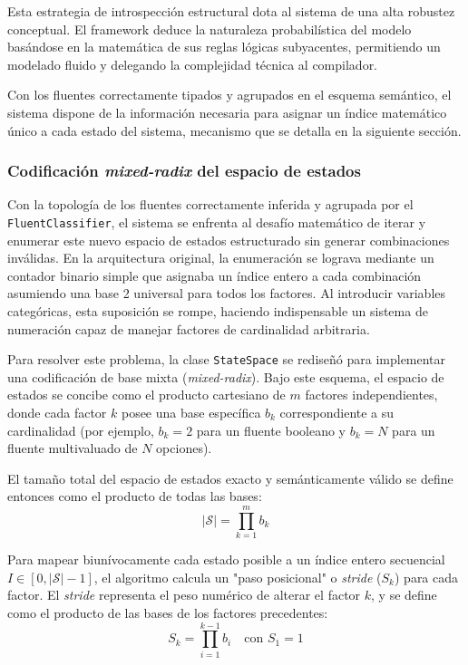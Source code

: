 Esta estrategia de introspección estructural dota al sistema de una alta robustez conceptual. El framework deduce la naturaleza probabilística del modelo basándose en la matemática de sus reglas lógicas subyacentes, permitiendo un modelado fluido y delegando la complejidad técnica al compilador. 

Con los fluentes correctamente tipados y agrupados en el esquema semántico, el sistema dispone de la información necesaria para asignar un índice matemático único a cada estado del sistema, mecanismo que se detalla en la siguiente sección.

\subsubsection{Codificación \textit{mixed-radix} del espacio de estados}
\label{sec:di-mixed-radix}

Con la topología de los fluentes correctamente inferida y agrupada por el \texttt{FluentClassifier}, el sistema se enfrenta al desafío matemático de iterar y enumerar este nuevo espacio de estados estructurado sin generar combinaciones inválidas. En la arquitectura original, la enumeración se lograva mediante un contador binario simple que asignaba un índice entero a cada combinación asumiendo una base 2 universal para todos los factores. Al introducir variables categóricas, esta suposición se rompe, haciendo indispensable un sistema de numeración capaz de manejar factores de cardinalidad arbitraria.

Para resolver este problema, la clase \texttt{StateSpace} se rediseñó para implementar una codificación de base mixta (\textit{mixed-radix}). Bajo este esquema, el espacio de estados se concibe como el producto cartesiano de $m$ factores independientes, donde cada factor $k$ posee una base específica $b_k$ correspondiente a su cardinalidad (por ejemplo, $b_k = 2$ para un fluente booleano y $b_k = N$ para un fluente multivaluado de $N$ opciones).

El tamaño total del espacio de estados exacto y semánticamente válido se define entonces como el producto de todas las bases:
\begin{equation}
    |\mathcal{S}| = \prod_{k=1}^{m} b_k
\end{equation}

Para mapear biunívocamente cada estado posible a un índice entero secuencial $I \in [0, |\mathcal{S}| - 1]$, el algoritmo calcula un "paso posicional" o \textit{stride} ($S_k$) para cada factor. El \textit{stride} representa el peso numérico de alterar el factor $k$, y se define como el producto de las bases de los factores precedentes:
\begin{equation}
    S_k = \prod_{i=1}^{k-1} b_i \quad \text{con } S_1 = 1
\end{equation}

